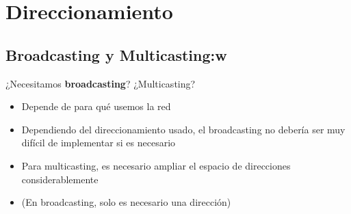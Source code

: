 \section{Direccionamiento}
\subsection{Broadcasting y Multicasting:w}
\begin{frame}{¿Necesitamos \textbf{broadcasting}? ¿Multicasting?}
    \begin{itemize}
        \item Depende de para qué usemos la red
        \item Dependiendo del direccionamiento usado, el broadcasting no debería ser muy difícil de implementar si es necesario
        \item Para multicasting, es necesario ampliar el espacio de direcciones considerablemente
        \item (En broadcasting, solo es necesario una dirección)
    \end{itemize}
\end{frame}